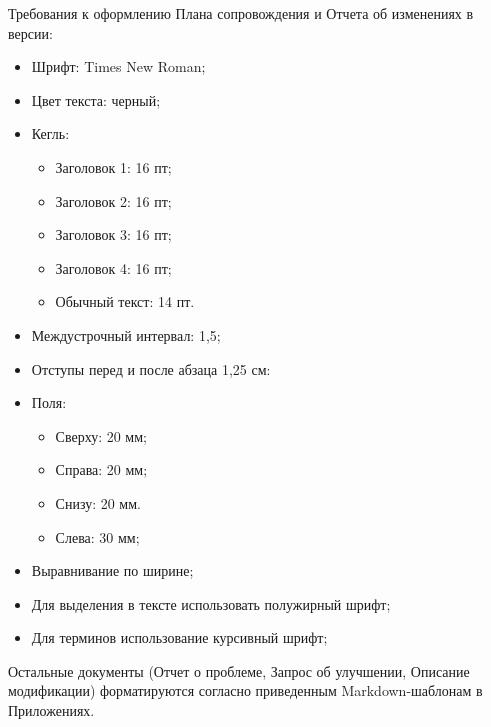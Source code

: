 Требования к оформлению Плана сопровождения и Отчета об изменениях в версии:
\begin{itemize}
    \item Шрифт: Times New Roman;
    \item Цвет текста: черный;
    \item Кегль:
    \begin{itemize}
        \item Заголовок 1: 16 пт;
        \item Заголовок 2: 16 пт;
        \item Заголовок 3: 16 пт;
        \item Заголовок 4: 16 пт;
        \item Обычный текст: 14 пт.
    \end{itemize}
    \item Междустрочный интервал: 1,5;
    \item Отступы перед и после абзаца 1,25 см:
    \item Поля:
    \begin{itemize}
        \item Сверху: 20 мм;
        \item Справа: 20 мм;
        \item Снизу: 20 мм.
        \item Слева: 30 мм;
    \end{itemize}
    \item Выравнивание по ширине;
    \item Для выделения в тексте использовать полужирный шрифт;
    \item Для терминов использование курсивный шрифт;
\end{itemize}

Остальные документы (Отчет о проблеме, Запрос об улучшении, Описание модификации) форматируются согласно приведенным Markdown-шаблонам в Приложениях.
